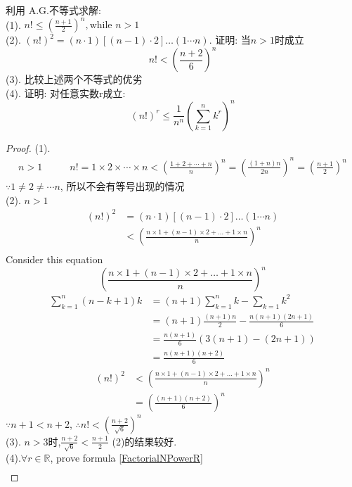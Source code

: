 \begin{example}
	利用 A.G.不等式求解:\\
	(1). $ n! \le (\frac{n+1}{2})^n, \text{while } n >1 $\\
	(2). $ (n!)^2 = (n\cdot 1)[(n-1)\cdot 2]\dots (1\cdots n) $. 证明: 当$ n > 1 $时成立
	\[n!< (\frac{n+2}{6})^n\]
	(3). 比较上述两个不等式的优劣\\
	(4). 证明: 对任意实数r成立:
	\begin{equation}\label{FactorialNPowerR}
		(n!)^r\le  \frac{1}{n^n} (\sum_{k=1}^n k^r)^n 
	\end{equation}
	\begin{proof}
		(1).
		\begin{align*}
			n>1 \qquad & n! = 1 \times 2 \times \cdots \times n < (\frac{1+2+\cdots + n}{n})^n = (\frac{(1+n)n}{2n})^n = (\frac{n+1}{2})^n
		\end{align*}
		$ \because 1 \neq 2 \neq \cdots n $, 所以不会有等号出现的情况\\
		(2). $ n > 1 $
		\begin{align*}		
			 (n!)^2 
			 & = (n\cdot 1)[(n-1)\cdot 2]\dots (1\cdots n)\\
			 & < (\frac{n\times1 + (n-1)\times 2 + \dots + 1\times n}{n})^n\\
		\end{align*}
		Consider this equation 
		\begin{equation}\label{keyn1nminus12}
			 (\frac{n\times1 + (n-1)\times 2 + \dots + 1\times n}{n})^n 
		\end{equation}
		\begin{align*}
			\sum_{k=1}^n (n-k+1)k 
			& = (n+1)\sum_{k=1}^nk - \sum_{k=1} k^2\\
			& = (n+1)\frac{(n+1)n}{2} - \frac{n(n+1)(2n+1)}{6}\\	
			& = \frac{n(n+1)}{6}(3(n+1) - (2n+1))\\
			& = \frac{n(n+1)(n+2)}{6}
		\end{align*}
		\begin{align*}		
			(n!)^2 
			& <  (\frac{n\times1 + (n-1)\times 2 + \dots + 1\times n}{n})^n\\
			& = (\frac{(n+1)(n+2)}{6})^n
		\end{align*}
		$ \because n+1<n+2 $,
		$ \therefore n! < (\frac{n+2}{\sqrt{6}})^n $\\
		(3). $ n>3 $时,$ \frac{n+2}{\sqrt{6}} < \frac{n+1}{2} $ (2)的结果较好.\\
		(4).$ \forall r\in \mathbb{R} $, prove formula \ref{FactorialNPowerR}
		\begin{align*}

\end{align*}
\end{proof}
\end{example}
